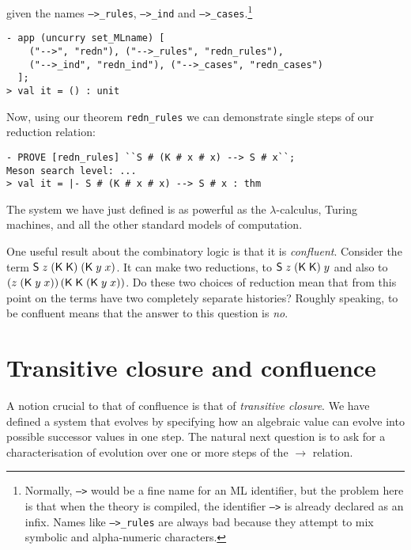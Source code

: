     given the names \texttt{-->\_rules}, \texttt{-->\_ind} and
    \texttt{-->\_cases}.\footnote{Normally, \texttt{-->} would be a
      fine name for an ML identifier, but the problem here is that
      when the theory is compiled, the identifier \texttt{-->} is
      already declared as an infix.  Names like \texttt{-->\_rules} are
      always bad because they attempt to mix symbolic and
    alpha-numeric characters.}
\begin{session}\begin{verbatim}
- app (uncurry set_MLname) [
    ("-->", "redn"), ("-->_rules", "redn_rules"),
    ("-->_ind", "redn_ind"), ("-->_cases", "redn_cases")
  ];
> val it = () : unit
\end{verbatim}\end{session}


Now, using our theorem \texttt{redn\_rules} we can demonstrate single
steps of our reduction relation:
\begin{session}\begin{verbatim}
- PROVE [redn_rules] ``S # (K # x # x) --> S # x``;
Meson search level: ...
> val it = |- S # (K # x # x) --> S # x : thm
\end{verbatim}\end{session}
    The system we have just defined is as powerful as the
    $\lambda$-calculus, Turing machines, and all the other standard
    models of computation.

    One useful result about the combinatory logic is that it is
    \emph{confluent}.  Consider the term ${\sf S}\;z\;({\sf K}\;{\sf K})\;({\sf K}\;
    y\; x)$.  It can make two reductions, to ${\sf S}\;z\;({\sf K}\;{\sf K})\;y$
    and also to $(z\;({\sf K}\;y\;x))\,({\sf K}\;{\sf K}\;({\sf K}\;y\;x))$.  Do these
    two choices of reduction mean that from this point on the terms
    have two completely separate histories?  Roughly speaking, to be
    confluent means that the answer to this question is \emph{no}.


\section{Transitive closure and confluence}
\label{sec:Transitive-Clos-Conf}

A notion crucial to that of confluence is that of \emph{transitive
  closure}.  We have defined a system that evolves by specifying how
an algebraic value can evolve into possible successor values in one
step.  The natural next question is to ask for a characterisation of
evolution over one or more steps of the $\rightarrow$ relation.

